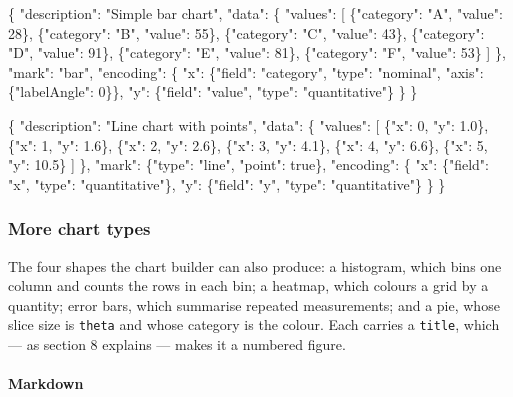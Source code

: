 \documentclass[
]{article}
\newenvironment{Shaded}{}{}
\newcommand{\NormalTok}[1]{#1}
\begin{document}
\begin{Shaded}
\begin{Highlighting}[]
\NormalTok{\{}
\NormalTok{  "description": "Simple bar chart",}
\NormalTok{  "data": \{}
\NormalTok{    "values": [}
\NormalTok{      \{"category": "A", "value": 28\}, \{"category": "B", "value": 55\},}
\NormalTok{      \{"category": "C", "value": 43\}, \{"category": "D", "value": 91\},}
\NormalTok{      \{"category": "E", "value": 81\}, \{"category": "F", "value": 53\}}
\NormalTok{    ]}
\NormalTok{  \},}
\NormalTok{  "mark": "bar",}
\NormalTok{  "encoding": \{}
\NormalTok{    "x": \{"field": "category", "type": "nominal", "axis": \{"labelAngle": 0\}\},}
\NormalTok{    "y": \{"field": "value", "type": "quantitative"\}}
\NormalTok{  \}}
\NormalTok{\}}
\end{Highlighting}
\end{Shaded}

\begin{Shaded}
\begin{Highlighting}[]
\NormalTok{\{}
\NormalTok{  "description": "Line chart with points",}
\NormalTok{  "data": \{}
\NormalTok{    "values": [}
\NormalTok{      \{"x": 0, "y": 1.0\}, \{"x": 1, "y": 1.6\}, \{"x": 2, "y": 2.6\},}
\NormalTok{      \{"x": 3, "y": 4.1\}, \{"x": 4, "y": 6.6\}, \{"x": 5, "y": 10.5\}}
\NormalTok{    ]}
\NormalTok{  \},}
\NormalTok{  "mark": \{"type": "line", "point": true\},}
\NormalTok{  "encoding": \{}
\NormalTok{    "x": \{"field": "x", "type": "quantitative"\},}
\NormalTok{    "y": \{"field": "y", "type": "quantitative"\}}
\NormalTok{  \}}
\NormalTok{\}}
\end{Highlighting}
\end{Shaded}

\subsubsection{More chart types}\label{more-chart-types}

The four shapes the chart builder can also produce: a histogram, which
bins one column and counts the rows in each bin; a heatmap, which
colours a grid by a quantity; error bars, which summarise repeated
measurements; and a pie, whose slice size is \texttt{theta} and whose
category is the colour. Each carries a \texttt{title}, which --- as
section 8 explains --- makes it a numbered figure.

\paragraph{Markdown}\label{markdown-7}
\end{document}
